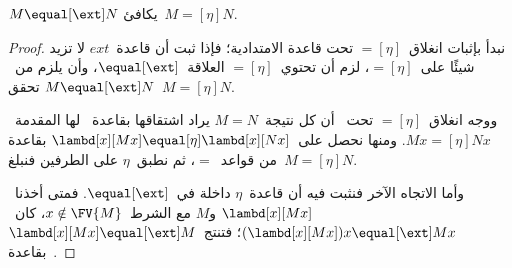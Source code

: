\documentclass[../../../include/open-logic-section]{subfiles}
\begin{document}
\begin{thm}
  $M \equal[\ext] N$ يكافئ~$M \equal[\eta] N$.
\end{thm}

\begin{proof}
  نبدأ بإثبات انغلاق~$\equal[\eta]$ تحت قاعدة الامتدادية؛ فإذا ثبت
  أن قاعدة~$ext$ لا تزيد شيئًا على~$\equal[\eta]$، لزم أن تحتوي~$\equal[\eta]$
  العلاقة~$\equal[\ext]$، وأن يلزم من~$M \equal[\ext] N$ تحقق~$M
  \equal[\eta] N$.

  ووجه انغلاق~$\equal[\eta]$ تحت~\ext{} أن كل نتيجة~$M \equal N$
  يراد اشتقاقها بقاعدة~\ext{} لها المقدمة~$Mx \equal[\eta] Nx$.
  ومنها نحصل على~$\lambd[x][Mx] \equal[\eta] \lambd[x][Nx]$
  بقاعدة من قواعد~$\equal$، ثم نطبق~$\eta$ على الطرفين فنبلغ~$M \equal[\eta] N$.

  وأما الاتجاه الآخر فنثبت فيه أن قاعدة~$\eta$ داخلة في~$\equal[\ext]$.
  فمتى أخذنا~$\lambd[x][Mx]$ و$M$ مع الشرط~$x \notin \FV{M}$،
  كان~$(\lambd[x][Mx])x \equal[\ext] Mx$؛
  فتنتج~$\lambd[x][Mx] \equal[\ext] M$ بقاعدة~\ext{}.
\end{proof}
\end{document}
